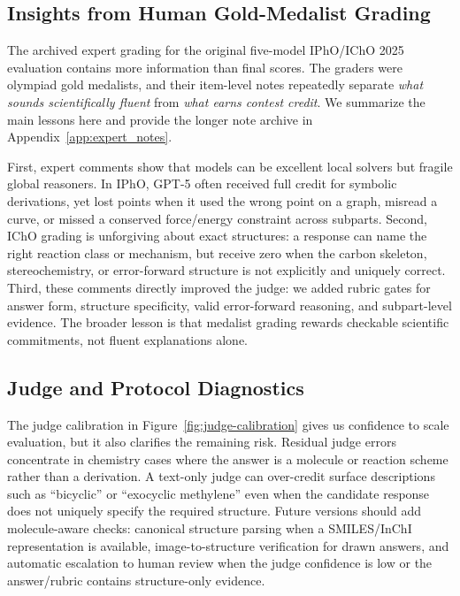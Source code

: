 \documentclass[11pt]{article}
\begin{document}
\subsection{Insights from Human Gold-Medalist Grading}
\label{sec:expert-insights}
The archived expert grading for the original five-model IPhO/IChO 2025 evaluation contains more information than final scores.
The graders were olympiad gold medalists, and their item-level notes repeatedly separate \emph{what sounds scientifically fluent} from \emph{what earns contest credit}.
We summarize the main lessons here and provide the longer note archive in Appendix~\ref{app:expert_notes}.

First, expert comments show that models can be excellent local solvers but fragile global reasoners.
In IPhO, GPT-5 often received full credit for symbolic derivations, yet lost points when it used the wrong point on a graph, misread a curve, or missed a conserved force/energy constraint across subparts.
Second, IChO grading is unforgiving about exact structures: a response can name the right reaction class or mechanism, but receive zero when the carbon skeleton, stereochemistry, or error-forward structure is not explicitly and uniquely correct.
Third, these comments directly improved the judge: we added rubric gates for answer form, structure specificity, valid error-forward reasoning, and subpart-level evidence.
The broader lesson is that medalist grading rewards checkable scientific commitments, not fluent explanations alone.

\subsection{Judge and Protocol Diagnostics}
The judge calibration in Figure~\ref{fig:judge-calibration} gives us confidence to scale evaluation, but it also clarifies the remaining risk.
Residual judge errors concentrate in chemistry cases where the answer is a molecule or reaction scheme rather than a derivation.
A text-only judge can over-credit surface descriptions such as ``bicyclic'' or ``exocyclic methylene'' even when the candidate response does not uniquely specify the required structure.
Future versions should add molecule-aware checks: canonical structure parsing when a SMILES/InChI representation is available, image-to-structure verification for drawn answers, and automatic escalation to human review when the judge confidence is low or the answer/rubric contains structure-only evidence.
\end{document}
